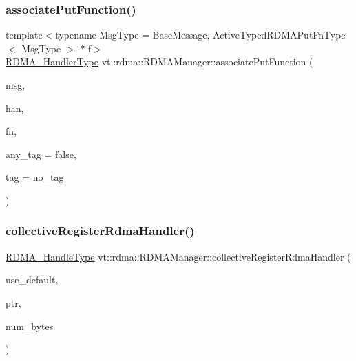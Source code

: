 \subsubsection{\texorpdfstring{associate\+Put\+Function()}{associatePutFunction()}}
{\footnotesize\ttfamily template$<$typename Msg\+Type  = Base\+Message, Active\+Typed\+R\+D\+M\+A\+Put\+Fn\+Type$<$ Msg\+Type $>$ $\ast$ f$>$ \\
\hyperlink{namespacevt_a9530efb893c0f3846e8ac5f0507e0f49}{R\+D\+M\+A\+\_\+\+Handler\+Type} vt\+::rdma\+::\+R\+D\+M\+A\+Manager\+::associate\+Put\+Function (\begin{DoxyParamCaption}\item[{Msg\+Type $\ast$}]{msg,  }\item[{\hyperlink{namespacevt_a10442579ec4e7ebef223818e64bcf908}{R\+D\+M\+A\+\_\+\+Handle\+Type} const \&}]{han,  }\item[{\hyperlink{structvt_1_1rdma_1_1_r_d_m_a_manager_ad9746ec3367968e16945ef88c1ac45ce}{R\+D\+M\+A\+\_\+\+Put\+Typed\+Function\+Type}$<$ Msg\+Type $>$ const \&}]{fn,  }\item[{bool const \&}]{any\+\_\+tag = {\ttfamily false},  }\item[{\hyperlink{namespacevt_a84ab281dae04a52a4b243d6bf62d0e52}{Tag\+Type} const \&}]{tag = {\ttfamily no\+\_\+tag} }\end{DoxyParamCaption})\hspace{0.3cm}{\ttfamily [inline]}}

\mbox{\label{structvt_1_1rdma_1_1_r_d_m_a_manager_a526b7c441125a9d5ed9528736be97819}} 
\subsubsection{\texorpdfstring{collective\+Register\+Rdma\+Handler()}{collectiveRegisterRdmaHandler()}}
{\footnotesize\ttfamily \hyperlink{namespacevt_a10442579ec4e7ebef223818e64bcf908}{R\+D\+M\+A\+\_\+\+Handle\+Type} vt\+::rdma\+::\+R\+D\+M\+A\+Manager\+::collective\+Register\+Rdma\+Handler (\begin{DoxyParamCaption}\item[{bool const \&}]{use\+\_\+default,  }\item[{\hyperlink{namespacevt_a9e2c953286c7616f7c218e9951790776}{R\+D\+M\+A\+\_\+\+Ptr\+Type} const \&}]{ptr,  }\item[{\hyperlink{namespacevt_aab8d55968084610ce3b17057981e9300}{Byte\+Type} const \&}]{num\+\_\+bytes }\end{DoxyParamCaption})\hspace{0.3cm}{\ttfamily [inline]}}

